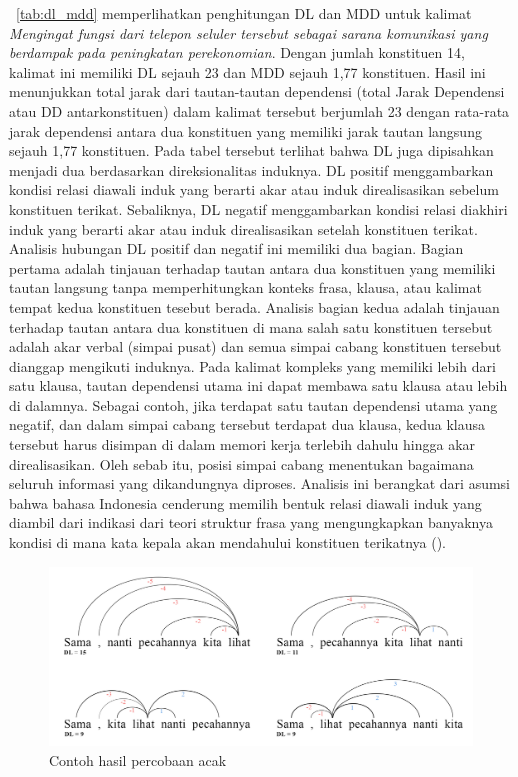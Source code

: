 \tab~\ref{tab:dl_mdd} memperlihatkan penghitungan DL dan MDD untuk kalimat \textit{Mengingat fungsi dari telepon seluler tersebut sebagai sarana komunikasi yang berdampak pada peningkatan perekonomian}. Dengan jumlah konstituen 14, kalimat ini memiliki DL sejauh 23 dan MDD sejauh 1,77 konstituen. Hasil ini menunjukkan total jarak dari tautan-tautan dependensi (total Jarak Dependensi atau DD antarkonstituen) dalam kalimat tersebut berjumlah 23 dengan rata-rata jarak dependensi antara dua konstituen yang memiliki jarak tautan langsung sejauh 1,77 konstituen. Pada tabel tersebut terlihat bahwa DL juga dipisahkan menjadi dua berdasarkan direksionalitas induknya. DL positif menggambarkan kondisi relasi diawali induk yang berarti  akar atau induk direalisasikan sebelum konstituen terikat. Sebaliknya, DL negatif menggambarkan kondisi relasi diakhiri induk yang berarti akar atau induk direalisasikan setelah konstituen terikat. Analisis hubungan DL positif dan negatif ini memiliki dua bagian. Bagian pertama adalah tinjauan terhadap tautan antara dua konstituen yang memiliki tautan langsung tanpa memperhitungkan konteks frasa, klausa, atau kalimat tempat kedua konstituen tesebut berada. Analisis bagian kedua adalah tinjauan terhadap tautan antara dua konstituen di mana salah satu konstituen tersebut adalah akar verbal (simpai pusat) dan semua simpai cabang konstituen tersebut dianggap mengikuti induknya. Pada kalimat kompleks yang memiliki lebih dari satu klausa, tautan dependensi utama ini dapat membawa satu klausa atau lebih di dalamnya. Sebagai contoh, jika terdapat satu tautan dependensi utama yang negatif, dan dalam simpai cabang tersebut terdapat dua klausa, kedua klausa tersebut harus disimpan di dalam memori kerja terlebih dahulu hingga akar direalisasikan. Oleh sebab itu, posisi simpai cabang menentukan bagaimana seluruh informasi yang dikandungnya diproses. Analisis ini berangkat dari asumsi bahwa bahasa Indonesia cenderung memilih bentuk relasi diawali induk yang diambil dari indikasi dari teori struktur frasa yang mengungkapkan banyaknya kondisi di mana kata kepala akan mendahului konstituen terikatnya (\citealp{kridalaksana2002struktur, sneddon2010indonesian}).

\begin{figure}
	\centering \includegraphics[width=0.8
	\textwidth] {pics/percobaan_acak.jpg} 
	\caption{Contoh hasil percobaan acak} 
\label{fig:percobaan_acak} 
\end{figure}

